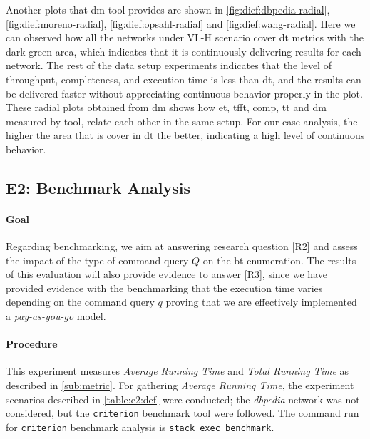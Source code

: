 Another plots that \acrshort{dm} tool provides are shown in \autoref{fig:dief:dbpedia-radial}, \autoref{fig:dief:moreno-radial}, \autoref{fig:dief:opsahl-radial} and \autoref{fig:dief:wang-radial}.
Here we can observed how all the networks under VL-H scenario cover \acrshort{dt} metrics with the dark green area, which indicates that it is continuously delivering results for each network. 
The rest of the data setup experiments indicates that the level of throughput, completeness, and execution time is less than \acrfull{dt}, and the results can be delivered faster without appreciating continuous behavior properly in the plot. 
These radial plots obtained from \acrshort{dm} shows how \acrfull{et}, \acrfull{tfft}, \acrfull{comp}, \acrfull{tt} and \acrshort{dm} measured by tool, relate each other in the same setup. 
For our case analysis, the higher the area that is cover in \acrfull{dt} the better, indicating a high level of continuous behavior.

\subsection{E2: Benchmark Analysis}\label{sub:sec:exp-2} 
\paragraph{Goal} Regarding benchmarking, we aim at answering research question [R2] and assess  the impact of the type of command query $Q$ on the  \acrshort{bt} enumeration.
The results of this evaluation will also provide evidence to answer [R3], since we have provided evidence with the benchmarking that the execution time varies depending on the command query $q$ proving that we are effectively implemented a \emph{pay-as-you-go} model. 

\paragraph{Procedure} This experiment measures \emph{Average Running Time} and \emph{Total Running Time} as  described in \autoref{sub:metric}. 
For gathering \emph{Average Running Time}, the experiment scenarios described in \autoref{table:e2:def} were conducted; the \emph{\acrshort{dbpedia}} network was not considered, but the \texttt{criterion} \cite{criterion} benchmark tool were followed.
The command run for \texttt{criterion} benchmark analysis is \texttt{stack exec benchmark}. 

